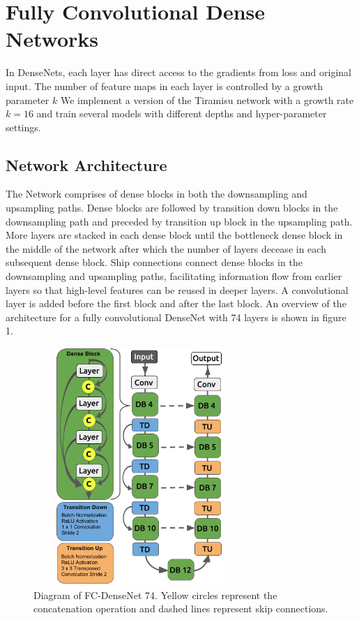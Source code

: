 \documentclass{llncs}
\begin{document}
\section{Fully Convolutional Dense Networks}

In DenseNets, each layer has direct access to the gradients from loss and original input. The number of feature maps in each layer is controlled by a growth parameter $k$ We implement a version of the Tiramisu network \cite{Tiramisu} with a growth rate $k = 16$ and train several models with different depths and hyper-parameter settings. 

\subsection{Network Architecture}
The Network comprises of dense blocks in both the downsampling and upsampling paths. Dense blocks are followed by transition down blocks in the downsampling path and preceded by transition up block in the upsampling path. More layers are stacked in each dense block until the bottleneck dense block in the middle of the network after which the number of layers decease in each subsequent dense block. Ship connections connect dense blocks in the downsampling and upsampling paths, facilitating information flow from earlier layers so that high-level features can be reused in deeper layers. A convolutional layer is added before the first block and after the last block. An overview of the architecture for a fully convolutional DenseNet with 74 layers is shown in figure 1.

\begin{figure}[t]
\centering
\includegraphics[width=8cm, height=9cm]{densenet}
\caption{Diagram of FC-DenseNet 74. Yellow circles represent the concatenation operation and dashed lines represent skip connections.}
\end{figure}
\end{document}
